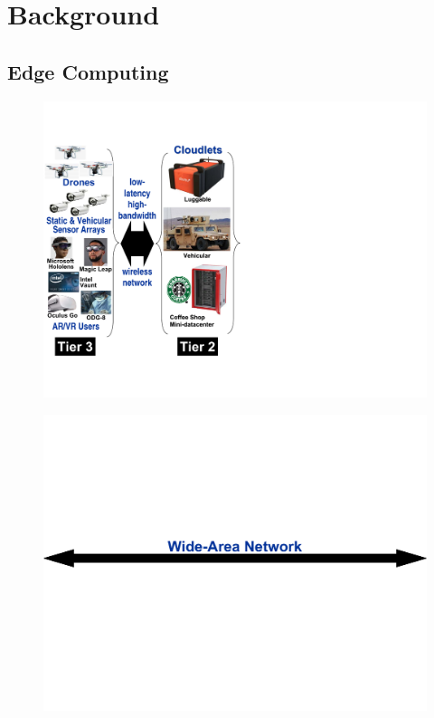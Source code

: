 \chapter{Background}
\label{chapter: background}

\section{Edge Computing}
\label{sec: bg-edge}

\begin{figure}[t]
\begin{minipage}[c]{2.5in}
\includegraphics[scale=0.45]{FIGS/fig-3tier-A.pdf}
\end{minipage}
\begin{minipage}[c]{2.7in}
\includegraphics[scale=0.25]{FIGS/fig-3tier-B-cropped.pdf}\\

\end{minipage}
\end{figure}
